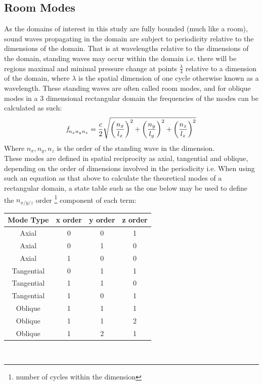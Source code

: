 \subsection{Room Modes}
As the domains of interest in this study are fully bounded (much like a room), sound waves propagating in the domain are subject to periodicity relative to the dimensions of the domain. That is at wavelengths relative to the dimensions of the domain, standing waves may occur within the domain i.e. there will be regions maximal and minimal pressure change at points $\frac{\lambda}{4}$ relative to a dimension of the domain, where $\lambda$ is the spatial dimension of one cycle otherwise known as a wavelength. These standing waves are often called room modes, and for oblique modes in a 3 dimensional rectangular domain the frequencies of the  modes can be calculated as such:\\
\begin{equation}
\textit{f}_{n_xn_yn_z} = \frac{c}{2} \sqrt{\left(\frac{n_x}{l_x}\right)^2 + \left(\frac{n_y}{l_y}\right)^2 + \left(\frac{n_z}{l_z}\right)^2}\\
\end{equation} 
Where $n_x, n_y, n_z$ is the order of the standing wave in the dimension.\\


These modes are defined in spatial reciprocity as axial, tangential and oblique, depending on the order of dimensions involved in the periodicity i.e. When using such an equation as that above to calculate the theoretical modes of a rectangular domain, a state table such as the one below may be used to define the $n_{x/y/z}$ order \footnote{number of cycles within the dimension} component of each term:\\

\begin{center}
\begin{tabular}{|c|c|c|c|} 
  \hline
 Mode Type & x order & y order & z order \\
 \hline
 Axial & 0 & 0 & 1 \\ 
 Axial & 0 & 1 & 0 \\  
 Axial & 1 & 0 & 0 \\
 Tangential & 0 & 1 & 1 \\ 
 Tangential & 1 & 1 & 0 \\  
 Tangential & 1 & 0 & 1 \\
 Oblique & 1 & 1 & 1 \\ 
 Oblique & 1 & 1 & 2 \\  
 Oblique & 1 & 2 & 1 \\        
 \hline
\end{tabular}\\
\end{center}

